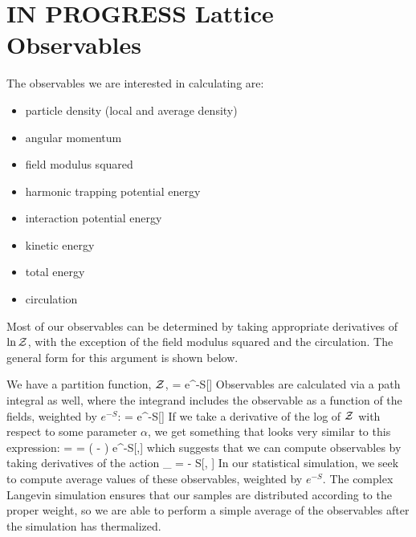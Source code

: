 \documentclass[../../RotatingBosons.tex]{subfiles}
\begin{document}

\section{\label{NRRBObservables}IN PROGRESS Lattice Observables}
The observables we are interested in calculating are:
\begin{itemize}
	\item particle density (local and average density)
	\item angular momentum
	\item field modulus squared
	\item harmonic trapping potential energy
	\item interaction potential energy
	\item kinetic energy
	\item total energy
	\item circulation
\end{itemize}
Most of our observables can be determined by taking appropriate derivatives of $\ln {\mathcal Z}$, with the exception of the field modulus squared and the circulation. The general form for this argument is shown below. 

We have a partition function, ${\mathcal Z}$, %
%
%
%
%
\beq
\CZ = \int \CD \phi e^{-S[\phi]}
\eeq
%
Observables are calculated via a path integral as well, where the integrand includes the observable as a function of the fields, weighted by $e^{-S}$:
%
\beq
\langle \CO \rangle = \int \CD \phi \CO[\phi]e^{-S[\phi]}
\eeq
%
If we take a derivative of the log of ${\mathcal Z}$ with respect to some parameter $\alpha$, we get something that looks very similar to this expression:
%
\beq
\frac{\partial \ln \CZ}{\partial \alpha} = \frac{\partial \CZ}{\partial \alpha} = \int \CD \phi ( - ) e^{-S[\phi,\alpha]}
\eeq
%
which suggests that we can compute observables by taking derivatives of the action
%
\beq
\hat{\CO}_{\alpha} = - \frac{\partial}{\partial \alpha} S[\phi, \alpha]
\eeq
%
In our statistical simulation, we seek to compute average values of these observables, weighted by $e^{-S}$. The complex Langevin simulation ensures that our samples are distributed according to the proper weight, so we are able to perform a simple average of the observables after the simulation has thermalized.
\end{document}
